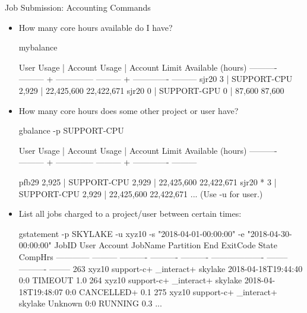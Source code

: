 \begin{frame}[fragile]{Job Submission: Accounting Commands}
\begin{itemize}
\item{How many core hours available do I have?}
\begin{semiverbatim}
\tiny
mybalance

User           Usage |        Account     Usage | Account Limit Available (hours)
---------- --------- + -------------- --------- + ------------- ---------
sjr20              3 |    SUPPORT-CPU     2,929 |    22,425,600 {\color{red}22,422,671}
sjr20              0 |    SUPPORT-GPU         0 |        87,600    {\color{red}87,600}
\end{semiverbatim}
\smallskip
\item{How many core hours does some other project or user have?}
\begin{semiverbatim}
\tiny
gbalance -p SUPPORT-CPU

User           Usage |        Account     Usage | Account Limit Available (hours)
---------- --------- + -------------- --------- + ------------- ---------

pfb29          2,925 |    SUPPORT-CPU     2,929 |    22,425,600 22,422,671
sjr20 *            3 |    SUPPORT-CPU     2,929 |    22,425,600 22,422,671
...
(Use -u for user.)
\end{semiverbatim}
\smallskip
\item{List all jobs charged to a project/user between certain times:}
\begin{semiverbatim}
\Tiny
gstatement -p SKYLAKE  -u xyz10 -s "2018-04-01-00:00:00" -e "2018-04-30-00:00:00" 
       JobID      User    Account    JobName  Partition                 End ExitCode      State  CompHrs 
------------ --------- ---------- ---------- ---------- ------------------- -------- ---------- -------- 
263              xyz10 support-c+ _interact+    skylake 2018-04-18T19:44:40      0:0    TIMEOUT      1.0
264              xyz10 support-c+ _interact+    skylake 2018-04-18T19:48:07      0:0 CANCELLED+      0.1
275              xyz10 support-c+ _interact+    skylake             Unknown      0:0    RUNNING      0.3
...
\end{semiverbatim}
\end{itemize}
\end{frame}

